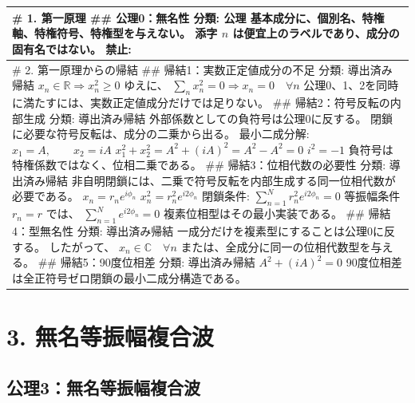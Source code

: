 \documentclass[
  a4paper]{ltjsarticle}
\newcounter{none} %
\begin{document}
{\def\LTcaptype{none} %
\begin{longtable}[]{@{}
  >{\raggedright\arraybackslash}p{}@{}}
\toprule\noalign{}
\begin{minipage}[b]{\linewidth}\raggedright
\# 1. 第一原理 \#\# 公理0：無名性 分類: 公理
基本成分に、個別名、特権軸、特権符号、特権型を与えない。 添字 \(n\)
は便宜上のラベルであり、成分の固有名ではない。 禁止:
\end{minipage} \\
\midrule\noalign{}
\endhead
\bottomrule\noalign{}
\endlastfoot
\# 2. 第一原理からの帰結 \#\# 帰結1：実数正定値成分の不足 分類:
導出済み帰結 \(
x_n\in\mathbb{R}
\Rightarrow
x_n^2\ge0
\) ゆえに、 \(
\sum_n x_n^2=0
\Rightarrow
x_n=0\quad\forall n
\) 公理0、1、2を同時に満たすには、実数正定値成分だけでは足りない。 \#\#
帰結2：符号反転の内部生成 分類: 導出済み帰結
外部係数としての負符号は公理0に反する。
閉鎖に必要な符号反転は、成分の二乗から出る。 最小二成分解: \(
x_1=A,\qquad x_2=iA
\) \(
x_1^2+x_2^2=A^2+(iA)^2=A^2-A^2=0
\) \(
i^2=-1
\) 負符号は特権係数ではなく、位相二乗である。 \#\#
帰結3：位相代数の必要性 分類: 導出済み帰結
非自明閉鎖には、二乗で符号反転を内部生成する同一位相代数が必要である。
\(
x_n=r_n e^{i\phi_n}
\) \(
x_n^2=r_n^2e^{i2\phi_n}
\) 閉鎖条件: \(
\sum_{n=1}^{N}r_n^2e^{i2\phi_n}=0
\) 等振幅条件 \(r_n=r\) では、 \(
\sum_{n=1}^{N}e^{i2\phi_n}=0
\) 複素位相型はその最小実装である。 \#\# 帰結4：型無名性 分類:
導出済み帰結 一成分だけを複素型にすることは公理0に反する。 したがって、
\(
x_n\in\mathbb{C}\quad\forall n
\) または、全成分に同一の位相代数型を与える。 \#\# 帰結5：90度位相差
分類: 導出済み帰結 \(
A^2+(iA)^2=0
\) 90度位相差は全正符号ゼロ閉鎖の最小二成分構造である。 \\
\end{longtable}
}

\section{3.
無名等振幅複合波}\label{ux7121ux540dux7b49ux632fux5e45ux8907ux5408ux6ce2}

\subsection{公理3：無名等振幅複合波}\label{ux516cux74063ux7121ux540dux7b49ux632fux5e45ux8907ux5408ux6ce2}
\end{document}
